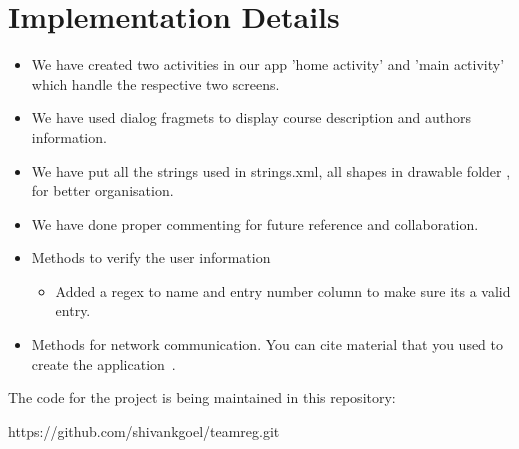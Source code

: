 \documentclass[12pt]{article}
\begin{document}
\section{Implementation Details}

\begin{itemize}
\item We have created two activities in our app 'home activity' and 'main activity' which handle the respective two screens.
\item We have used dialog fragmets to display course description and authors information.
\item We have put all the strings used in strings.xml, all shapes in drawable folder , for better organisation.
\item We have done proper commenting for future reference and collaboration.

\item Methods to verify the user information
	\begin{itemize}
		\item Added a regex to name and entry number column to make sure its a valid entry.
	\end{itemize}
\item Methods for network communication. You can cite material that you used to create the application~\cite{android_network_tutorial}.

\end{itemize}


The code for the project is being maintained in this repository: 
\begin{center}
	 https://github.com/shivankgoel/teamreg.git
\end{center}



\end{document}
